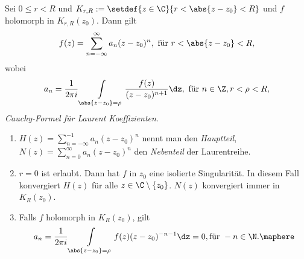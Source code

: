 \begin{prop}
\label{prop:2.80}
Sei $0\le r<R$ und $K_{r,R} :=\setdef{z\in\C}{r<\abs{z-z_0}<R}$ und $f$
holomorph in $K_{r,R}(z_0)$. Dann gilt
\begin{align*}
f(z) = \sum\limits_{n=-\infty}^\infty a_n (z-z_0)^n, \text{ für }
r<\abs{z-z_0}<R,
\end{align*}
wobei
\begin{align*}
a_n = \frac{1}{2\pi i}\int\limits_{\abs{z-z_0}=\rho}
\frac{f(z)}{(z-z_0)^{n+1}}\dz, \text{ für } n\in\Z, r<\rho<R,
\end{align*}
\emph{Cauchy-Formel für Laurent Koeffizienten}.\fishhere
\end{prop}
\begin{bem}
\label{bem:2.81}
\begin{enumerate}[label=\arabic{*}.)]
  \item $H(z) = \sum\limits_{n=-\infty}^{-1} a_n (z-z_0)^n$ nennt man den
  \emph{Hauptteil}, $N(z) = \sum\limits_{n=0}^\infty a_n (z-z_0)^n$ den \emph{Nebenteil} der
  Laurentreihe.
  \item $r=0$ ist erlaubt. Dann  hat $f$ in $z_0$ eine isolierte Singularität.
  In diesem Fall konvergiert $H(z)$ für alle $z\in\C\setminus\{z_0\}$. $N(z)$
  konvergiert immer in $K_R(z_0)$.
  \item Falls $f$ holomorph in $K_R(z_0)$, gilt
  \begin{align*}
  a_n = \frac{1}{2\pi i}\int\limits_{\abs{z-z_0}=\rho} f(z)(z-z_0)^{-n-1}\dz =
  0, \text{für } -n\in\N.\maphere
  \end{align*}
\end{enumerate}
\end{bem}
